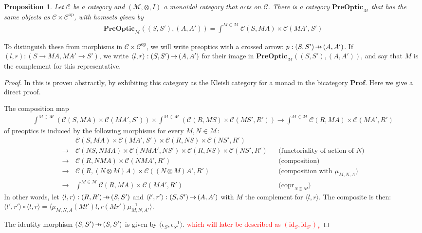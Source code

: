 \documentclass[11pt,a4paper]{article}
\theoremstyle{plain}
\newtheorem{proposition}[theorem]{Proposition}
\theoremstyle{definition}
\newcommand{\C}{\mathscr{C}}
\newcommand{\M}{\mathscr{M}}
\newcommand{\Prof}{\mathbf{Prof}}
\newcommand{\PreOptic}{\mathbf{PreOptic}}
\newcommand{\id}{\mathrm{id}}
\newcommand{\op}{\mathrm{op}}
\DeclareMathOperator{\copr}{copr}
\newcommand{\hto}{\ensuremath{\,\mathaccent\shortmid\rightarrow\,}}
\newcommand{\todo}[1]{\textcolor{red}{\small #1}}
\begin{document}
\begin{proposition}
Let $\C$ be a category and $(\M, \otimes, I)$ a monoidal category that acts on $\C$. There is a category $\PreOptic_\M$ that has the same objects as $\C \times \C^\op$, with homsets given by
\begin{align*}
\PreOptic_\M((S, S'), (A, A')) = \int^{M \in \M} \C(S, M A) \times \C(M A', S')
\end{align*}
\end{proposition}
To distinguish these from morphisms in $\C \times \C^\op$, we will write preoptics with a crossed arrow: $p : (S, S') \hto (A, A')$. If $(l,r) : (S \to M A, M A' \to S')$, we write $\langle l, r \rangle : (S, S') \hto (A, A')$ for their image in $\PreOptic_\M((S, S'), (A, A'))$, and say that $M$ is the complement for this representative.
\begin{proof}
In \cite[Section 6]{Doubles} this is proven abstractly, by exhibiting this category as the Kleisli category for a monad in the bicategory $\Prof$. Here we give a direct proof.

The composition map
\begin{align*}
\int^{M \in \M} \left(\C(S, M A) \times \C(M A', S')\right) \times \int^{M \in \M} \left( \C(R, M S) \times \C(M S', R')\right) \to \int^{M \in \M} \C(R, M A) \times \C(M A', R')
\end{align*}
of preoptics is induced by the following morphisms for every $M, N \in \M$:
\begin{align*}
&\C(S, M A) \times \C(M A', S') \times \C(R, N S) \times \C(N S', R')\\
\to \,& \C(NS, NM A) \times \C(NM A', NS') \times \C(R, N S) \times \C(N S', R') && \text{(functoriality of action of $N$)} \\
\to \,& \C(R, N M A) \times \C(N M A', R') && \text{(composition)} \\
\to \,& \C(R, (N \otimes M) A) \times \C((N \otimes M) A', R') && \text{(composition with $\mu_{M,N,A}$)} \\
\to \,&\int^{M \in \M} \C(R, M A) \times \C(M A', R') && \text{($\copr_{N \otimes M}$)}
\end{align*}
In other words, let $\langle l, r \rangle : (R, R') \hto (S, S')$ and $\langle l', r' \rangle : (S, S') \hto (A, A')$ with $M$ the complement for $\langle l, r \rangle$. The composite is then: $\langle l', r' \rangle \circ \langle l, r \rangle = \langle \mu_{M,N,A}(M l')l, r(Mr')\mu^{-1}_{M,N,A'} \rangle$. 

The identity morphism $(S, S') \hto (S, S')$ is given by $\langle \epsilon_S, \epsilon_{S'}^{-1} \rangle$. \todo{which will later be described as $(\id_S, \id_{S'})_*$}


\end{proof}
\end{document}
